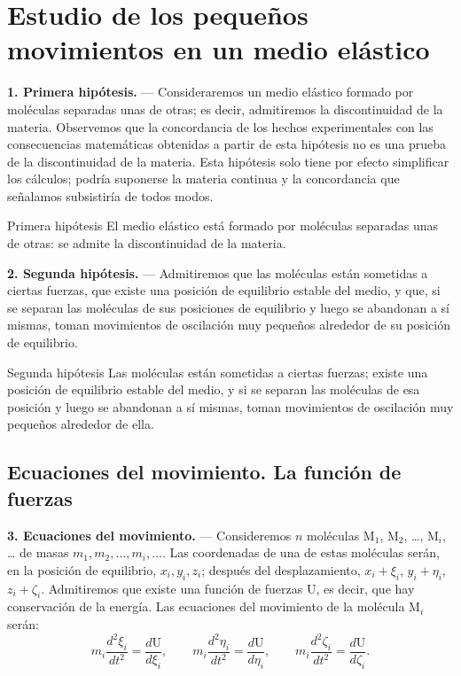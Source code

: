 \chapter{Estudio de los pequeños movimientos en un medio elástico}
\label{cap:movimientos-pequenos}

\noindent\textbf{1. Primera hipótesis.} — Consideraremos un medio elástico
formado por moléculas separadas unas de otras; es decir, admitiremos la
discontinuidad de la materia. Observemos que la concordancia de los hechos
experimentales con las consecuencias matemáticas obtenidas a partir de esta
hipótesis no es una prueba de la discontinuidad de la materia. Esta
hipótesis solo tiene por efecto simplificar los cálculos; podría suponerse
la materia continua y la concordancia que señalamos subsistiría de todos
modos.

\begin{enunciado}{Primera hipótesis}
El medio elástico está formado por moléculas separadas unas de otras: se
admite la discontinuidad de la materia.
\end{enunciado}

\noindent\textbf{2. Segunda hipótesis.} — Admitiremos que las moléculas
están sometidas a ciertas fuerzas, que existe una posición de equilibrio
estable del medio, y que, si se separan las moléculas de sus posiciones de
equilibrio y luego se abandonan a sí mismas, toman movimientos de
oscilación muy pequeños alrededor de su posición de equilibrio.

\begin{enunciado}{Segunda hipótesis}
Las moléculas están sometidas a ciertas fuerzas; existe una posición de
equilibrio estable del medio, y si se separan las moléculas de esa
posición y luego se abandonan a sí mismas, toman movimientos de oscilación
muy pequeños alrededor de ella.
\end{enunciado}

\section{Ecuaciones del movimiento. La función de fuerzas}

\noindent\textbf{3. Ecuaciones del movimiento.} — Consideremos $n$
moléculas $\mathrm{M}_1$, $\mathrm{M}_2$, \ldots, $\mathrm{M}_i$, \ldots{} de masas
$m_1,m_2,\ldots,m_i,\ldots$. Las coordenadas de una de estas moléculas serán,
en la posición de equilibrio, $x_i,y_i,z_i$; después del desplazamiento,
$x_i+\xi_i$, $y_i+\eta_i$, $z_i+\zeta_i$. Admitiremos que existe una función de
fuerzas $\mathrm{U}$, es decir, que hay conservación de la energía. Las
ecuaciones del movimiento de la molécula $\mathrm{M}_i$ serán:
\begin{equation}
m_i\frac{d^2\xi_i}{dt^2}=\frac{d\mathrm{U}}{d\xi_i},\qquad
m_i\frac{d^2\eta_i}{dt^2}=\frac{d\mathrm{U}}{d\eta_i},\qquad
m_i\frac{d^2\zeta_i}{dt^2}=\frac{d\mathrm{U}}{d\zeta_i}.
\tag{1}
\end{equation}

